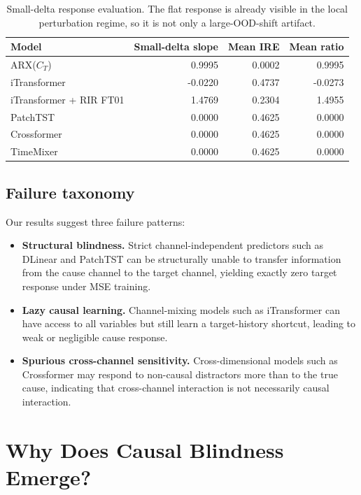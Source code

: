 \documentclass{article}
\begin{document}
\begin{table}[t]
\centering
\caption{Small-delta response evaluation. The flat response is already visible in
the local perturbation regime, so it is not only a large-OOD-shift artifact.}
\label{tab:small_delta}
\begin{tabular}{lrrr}
\toprule
Model & Small-delta slope & Mean IRE & Mean ratio \\
\midrule
ARX($C_T$) & 0.9995 & 0.0002 & 0.9995 \\
iTransformer & -0.0220 & 0.4737 & -0.0273 \\
iTransformer + RIR FT01 & 1.4769 & 0.2304 & 1.4955 \\
PatchTST & 0.0000 & 0.4625 & 0.0000 \\
Crossformer & 0.0000 & 0.4625 & 0.0000 \\
TimeMixer & 0.0000 & 0.4625 & 0.0000 \\
\bottomrule
\end{tabular}
\end{table}

\subsection{Failure taxonomy}

Our results suggest three failure patterns:
\begin{itemize}[leftmargin=*]
    \item \textbf{Structural blindness.} Strict channel-independent predictors such
    as DLinear and PatchTST can be structurally unable to transfer information from
    the cause channel to the target channel, yielding exactly zero target response
    under MSE training.
    \item \textbf{Lazy causal learning.} Channel-mixing models such as iTransformer
    can have access to all variables but still learn a target-history shortcut, leading
    to weak or negligible cause response.
    \item \textbf{Spurious cross-channel sensitivity.} Cross-dimensional models such
    as Crossformer may respond to non-causal distractors more than to the true cause,
    indicating that cross-channel interaction is not necessarily causal interaction.
\end{itemize}

\section{Why Does Causal Blindness Emerge?}
\end{document}
